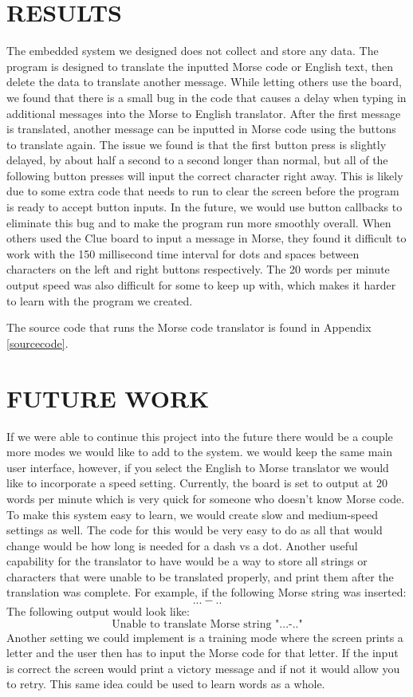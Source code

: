 \documentclass[12pt]{article}
\begin{document}
\section{RESULTS}
The embedded system we designed does not collect and store any data. The program is designed to translate the inputted Morse code or English text, then delete the data to translate another message. While letting others use the board, we found that there is a small bug in the code that causes a delay when typing in additional messages into the Morse to English translator. After the first message is translated, another message can be inputted in Morse code using the buttons to translate again. The issue we found is that the first button press is slightly delayed, by about half a second to a second longer than normal, but all of the following button presses will input the correct character right away. This is likely due to some extra code that needs to run to clear the screen before the program is ready to accept button inputs. In the future, we would use button callbacks to eliminate this bug and to make the program run more smoothly overall. When others used the Clue board to input a message in Morse, they found it difficult to work with the 150 millisecond time interval for dots and spaces between characters on the left and right buttons respectively. The 20 words per minute output speed was also difficult for some to keep up with, which makes it harder to learn with the program we created.

The source code that runs the Morse code translator is found in Appendix \ref{sourcecode}.

\section{FUTURE WORK}
If we were able to continue this project into the future there would be a couple more modes we would like to add to the system. we would keep the same main user interface, however, if you select the English to Morse translator we would like to incorporate a speed setting. Currently, the board is set to output at 20 words per minute which is very quick for someone who doesn't know Morse code. To make this system easy to learn, we would create slow and medium-speed settings as well. The code for this would be very easy to do as all that would change would be how long is needed for a dash vs a dot. Another useful capability for the translator to have would be a way to store all strings or characters that were unable to be translated properly, and print them after the translation was complete. For example, if the following Morse string was inserted: $$...-..$$ The following output would look like:
$$\text{Unable to translate Morse string "...-.."}$$Another setting we could implement is a training mode where the screen prints a letter and the user then has to input the Morse code for that letter. If the input is correct the screen would print a victory message and if not it would allow you to retry. This same idea could be used to learn words as a whole.\\
\\
\end{document}
